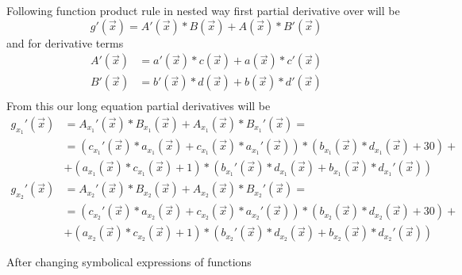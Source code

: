 \documentclass[main.tex]{subfiles}
\begin{document}
Following function product rule in nested way first partial derivative over will be
\begin{equation}
    g'(\vec{x}) = A'(\vec{x})*B(\vec{x}) + A(\vec{x})*B'(\vec{x})
\end{equation}
and for derivative terms
\begin{equation}
\begin{split}
    A'(\vec{x}) & = a'(\vec{x})*c(\vec{x}) + a(\vec{x})*c'(\vec{x})\\
    B'(\vec{x}) & = b'(\vec{x})*d(\vec{x}) + b(\vec{x})*d'(\vec{x})\\
    \end{split}
\end{equation}
From this our long equation partial derivatives will be
\begin{equation}
\begin{split}
    g_{x_1}'(\vec{x}) & = A_{x_1}'(\vec{x})*B_{x_1}(\vec{x}) + A_{x_1}(\vec{x})*B_{x_1}'(\vec{x}) =\\
    & = (c_{x_1}'(\vec{x})*a_{x_1}(\vec{x}) + c_{x_1}(\vec{x})*a_{x_1}'(\vec{x})) * (b_{x_1}(\vec{x})*d_{x_1}(\vec{x}) + 30) + \\
    &+ (a_{x_1}(\vec{x})*c_{x_1}(\vec{x})+1)*(b_{x_1}'(\vec{x})*d_{x_1}(\vec{x})+b_{x_1}(\vec{x})*d_{x_1}'(\vec{x}))\\
    g_{x_2}'(\vec{x}) & = A_{x_2}'(\vec{x})*B_{x_2}(\vec{x}) + A_{x_2}(\vec{x})*B_{x_2}'(\vec{x}) =\\
    & = (c_{x_2}'(\vec{x})*a_{x_2}(\vec{x}) + c_{x_2}(\vec{x})*a_{x_2}'(\vec{x})) * (b_{x_2}(\vec{x})*d_{x_2}(\vec{x}) + 30) + \\
    &+ (a_{x_2}(\vec{x})*c_{x_2}(\vec{x})+1)*(b_{x_2}'(\vec{x})*d_{x_2}(\vec{x})+b_{x_2}(\vec{x})*d_{x_2}'(\vec{x}))\\\\
    \end{split}
\end{equation}
After changing symbolical expressions of functions
\end{document}
